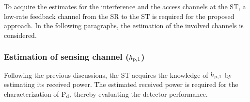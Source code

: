 To acquire the estimates for the interference and the access channels at the ST, a low-rate feedback channel from the SR to the ST is required for the proposed approach. 
In the following paragraphs, the estimation of the involved channels is considered. %
\subsubsection{Estimation of sensing channel ($h_{\text{p,1}}$)}
Following the previous discussions, the ST acquires the knowledge of $h_{\text{p,1}}$ by estimating its received power. The estimated received power is required for the characterization of $\text{P}_{\text{d}}$, thereby evaluating the detector performance. %

